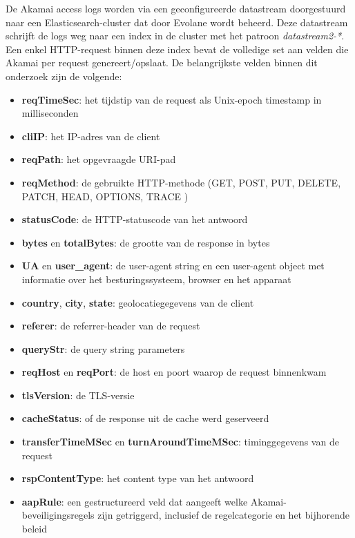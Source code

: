 De Akamai access logs worden via een geconfigureerde datastream doorgestuurd naar een Elasticsearch-cluster dat door Evolane wordt beheerd. Deze datastream schrijft de logs weg naar een index in de cluster met het patroon \textit{datastream2-*}. Een enkel HTTP-request binnen deze index bevat de volledige set aan velden die Akamai per request genereert/opslaat. De belangrijkste velden binnen dit onderzoek zijn de volgende: 

\begin{itemize}
    \item \textbf{reqTimeSec}: het tijdstip van de request als Unix-epoch timestamp in milliseconden
    \item \textbf{cliIP}: het IP-adres van de client
    \item \textbf{reqPath}: het opgevraagde URI-pad
    \item \textbf{reqMethod}: de gebruikte HTTP-methode (GET, POST, PUT, DELETE, PATCH, HEAD, OPTIONS, TRACE )
    \item \textbf{statusCode}: de HTTP-statuscode van het antwoord
    \item \textbf{bytes} en \textbf{totalBytes}: de grootte van de response in bytes
    \item \textbf{UA} en \textbf{user\_agent}: de user-agent string en een user-agent object met informatie over het besturingssysteem, browser en het apparaat
    \item \textbf{country}, \textbf{city}, \textbf{state}: geolocatiegegevens van de client
    \item \textbf{referer}: de referrer-header van de request
    \item \textbf{queryStr}: de query string parameters
    \item \textbf{reqHost} en \textbf{reqPort}: de host en poort waarop de request binnenkwam
    \item \textbf{tlsVersion}: de TLS-versie
    \item \textbf{cacheStatus}: of de response uit de cache werd geserveerd
    \item \textbf{transferTimeMSec} en \textbf{turnAroundTimeMSec}: timinggegevens van de request
    \item \textbf{rspContentType}: het content type van het antwoord
    \item \textbf{aapRule}: een gestructureerd veld dat aangeeft welke Akamai-beveiligingsregels zijn getriggerd, inclusief de regelcategorie en het bijhorende beleid
\end{itemize}

